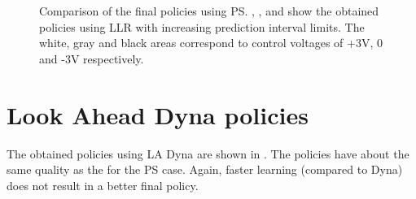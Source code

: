 \begin{figure}[htbp]
{\label{fig:PS-PS4_policy}
} 
\caption[Final policy using \acs{PS}]{Comparison of the final policies using \ac{PS}. , ,  and  show the obtained policies using \acs{LLR} with increasing prediction interval limits. The white, gray and black areas correspond to control voltages of +3V, 0 and -3V respectively.}
\label{fig:PS-PS_policies}
\end{figure}


\newpage
\section{Look Ahead Dyna policies}
The obtained policies using \ac{LA Dyna} are shown in . The policies have about the same quality as the for the \ac{PS} case. Again, faster learning (compared to Dyna) does not result in a better final policy.

